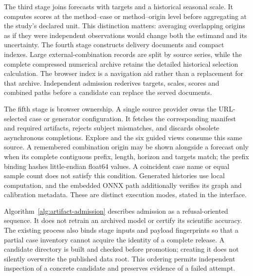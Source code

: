 The third stage joins forecasts with targets and a historical seasonal scale. It computes scores at the method--case or method--origin level before aggregating at the study's declared unit. This distinction matters: averaging overlapping origins as if they were independent observations would change both the estimand and its uncertainty. The fourth stage constructs delivery documents and compact indexes. Large external-combination records are split by source series, while the complete compressed numerical archive retains the detailed historical selection calculation. The browser index is a navigation aid rather than a replacement for that archive. Independent admission rederives targets, scales, scores and combined paths before a candidate can replace the served documents.

The fifth stage is browser ownership. A single source provider owns the URL-selected case or generator configuration. It fetches the corresponding manifest and required artifacts, rejects subject mismatches, and discards obsolete asynchronous completions. Explore and the six guided views consume this same source. A remembered combination origin may be shown alongside a forecast only when its complete contiguous prefix, length, horizon and targets match; the prefix binding hashes little-endian float64 values. A coincident case name or equal sample count does not satisfy this condition. Generated histories use local computation, and the embedded ONNX path additionally verifies its graph and calibration metadata. These are distinct execution modes, stated in the interface.

Algorithm~\ref{alg:artifact-admission} describes admission as a refusal-oriented sequence. It does not retrain an archived model or certify its scientific accuracy. The existing process also binds stage inputs and payload fingerprints so that a partial case inventory cannot acquire the identity of a complete release. A candidate directory is built and checked before promotion; creating it does not silently overwrite the published data root. This ordering permits independent inspection of a concrete candidate and preserves evidence of a failed attempt.


